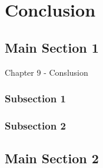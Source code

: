 
\chapter{Conclusion} %

\label{Chapter9} %


\section{Main Section 1}
Chapter 9
- Conslusion


\subsection{Subsection 1}



\subsection{Subsection 2}


\section{Main Section 2}

